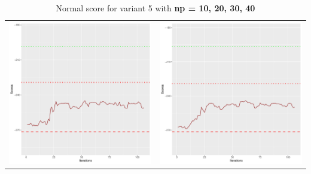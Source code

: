 \documentclass[]{scrartcl}
\begin{document}
\begin{table}[h!]
\begin{tabular}{cc}
\includegraphics[scale = 0.4]{./figs/asia/v5/30/boundsEvolution-107.pdf} & 
\includegraphics[scale = 0.4]{./figs/asia/v5/40/boundsEvolution-107.pdf} \\
\end{tabular}
\caption{Normal score for variant 5 with \textbf{np =  10, 20, 30, 40}}
\end{table}
\end{document}
